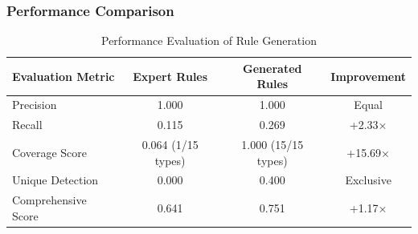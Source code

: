 \documentclass[runningheads]{llncs}
\begin{document}
\subsubsection{Performance Comparison}

\begin{table}[H]
    \centering
    \caption{Performance Evaluation of Rule Generation}
    \label{tab:rule_performance}
    \begin{tabular}{l c c c}
    \toprule
    Evaluation Metric & Expert Rules & Generated Rules & Improvement \\
    \midrule
    Precision & 1.000 & 1.000 & Equal \\
    Recall & 0.115 & 0.269 & +2.33× \\
    Coverage Score & 0.064 (1/15 types) & 1.000 (15/15 types) & +15.69× \\
    Unique Detection & 0.000 & 0.400 & Exclusive \\
    Comprehensive Score & 0.641 & 0.751 & +1.17× \\
    \bottomrule
    \end{tabular}
\end{table}
\end{document}
